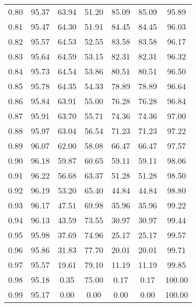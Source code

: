 \begin{tabular}{|c|c|c|c|c|c|c|}
      0.80 &     95.37 &     63.94 &      51.20 &   85.09 &      85.09 &         95.89 \\
      0.81 &     95.47 &     64.30 &      51.91 &   84.45 &      84.45 &         96.03 \\
      0.82 &     95.57 &     64.53 &      52.55 &   83.58 &      83.58 &         96.17 \\
      0.83 &     95.64 &     64.59 &      53.15 &   82.31 &      82.31 &         96.32 \\
      0.84 &     95.73 &     64.54 &      53.86 &   80.51 &      80.51 &         96.50 \\
      0.85 &     95.78 &     64.35 &      54.33 &   78.89 &      78.89 &         96.64 \\
      0.86 &     95.84 &     63.91 &      55.00 &   76.28 &      76.28 &         96.84 \\
      0.87 &     95.91 &     63.70 &      55.71 &   74.36 &      74.36 &         97.00 \\
      0.88 &     95.97 &     63.04 &      56.54 &   71.23 &      71.23 &         97.22 \\
      0.89 &     96.07 &     62.00 &      58.08 &   66.47 &      66.47 &         97.57 \\
      0.90 &     96.18 &     59.87 &      60.65 &   59.11 &      59.11 &         98.06 \\
      0.91 &     96.22 &     56.68 &      63.37 &   51.28 &      51.28 &         98.50 \\
      0.92 &     96.19 &     53.20 &      65.40 &   44.84 &      44.84 &         98.80 \\
      0.93 &     96.17 &     47.51 &      69.98 &   35.96 &      35.96 &         99.22 \\
      0.94 &     96.13 &     43.59 &      73.55 &   30.97 &      30.97 &         99.44 \\
      0.95 &     95.98 &     37.69 &      74.96 &   25.17 &      25.17 &         99.57 \\
      0.96 &     95.86 &     31.83 &      77.70 &   20.01 &      20.01 &         99.71 \\
      0.97 &     95.57 &     19.61 &      79.10 &   11.19 &      11.19 &         99.85 \\
      0.98 &     95.18 &      0.35 &      75.00 &    0.17 &       0.17 &        100.00 \\
      0.99 &     95.17 &      0.00 &       0.00 &    0.00 &       0.00 &        100.00 \\
\bottomrule
\end{tabular}
